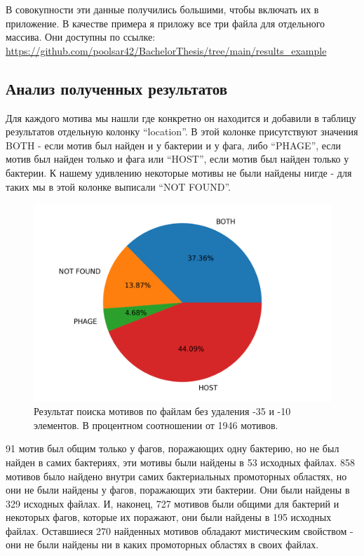 \documentclass[14pt]{extarticle}
\begin{document}
    \par{В совокупности эти данные получились большими, чтобы включать их в приложение. В качестве примера я приложу все
    три файла для отдельного массива. Они доступны по 
    ссылке: \url{https://github.com/poolsar42/BachelorThesis/tree/main/results_example}}
    
    \begin{center}
    \subsection{Анализ полученных результатов}
    \end{center}
    
    \par{Для каждого мотива мы нашли где конкретно он находится и добавили в таблицу результатов
    отдельную колонку ``location''. В этой колонке присутствуют значения BOTH - если мотив был найден и у бактерии и у
    фага, либо ``PHAGE'', если мотив был найден только и фага или ``HOST'', если мотив был найден только у бактерии. К
    нашему удивлению некоторые мотивы не были найдены нигде - для таких мы в этой колонке выписали ``NOT FOUND''.}
    
     \begin{figure}[h]
        \centering
        \includegraphics[width=\textwidth]{img/plot.png}
        \caption{Результат поиска мотивов по файлам без удаления -35 и -10 элементов. В процентном соотношении от 1946 
        мотивов.}
        \label{fig:skybox}
    \end{figure}
    
    \par{91 мотив был общим только у фагов, поражающих одну бактерию, но не был найден в самих бактериях, эти мотивы 
    были найдены в 53 исходных файлах. 858 мотивов было найдено внутри самих бактериальных промоторных областях, но они 
    не были найдены у фагов, поражающих эти бактерии. Они были найдены в 329 исходных файлах. И, наконец, 727 мотивов 
    были общими для бактерий и некоторых фагов, которые их поражают, они были найдены в 195 исходных файлах.  Оставшиеся
    270 найденных мотивов обладают мистическим свойством - они не были найдены ни в каких промоторных областях в своих 
    файлах.}
\end{document}
